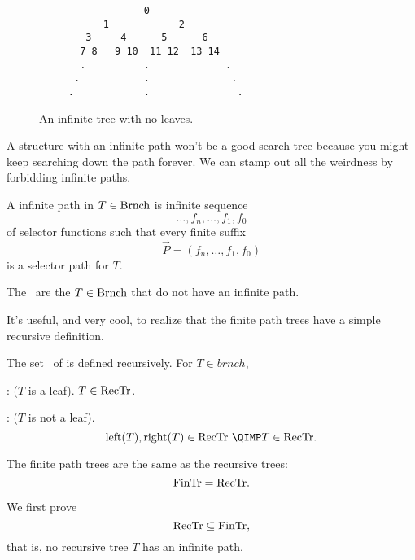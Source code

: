 \begin{figure}


\begin{verbatim}
                  0
           1            2
        3     4      5      6
       7 8   9 10  11 12  13 14
       .          .             . 
      .           .              .
     .            .               . 

\end{verbatim}

\caption{An infinite tree with no leaves.}

\label{inftree123}

\end{figure}

A structure with an infinite path won't be a good search tree because
you might keep searching down the path forever.  We can stamp out all
the weirdness by forbidding infinite paths.

\begin{definition}
A infinite path in $T \in \text{Brnch}$ is infinite sequence
\[
\dots,f_n,\dots,f_1,f_0
\]
of selector functions such that every finite suffix
\[
\vec{P} = (f_n,\dots, f_1,f_0)
\]
is a selector path for $T$.

The  \fintr\ are the $T \in \text{Brnch}$ that do
not have an infinite path.
\end{definition}

It's useful, and very cool, to realize that the finite path trees have
a simple recursive definition.

\begin{definition}
The set \rectr\ of  is defined recursively.  For $T \in brnch$,

: ($T$ is a leaf).  $T \in \text{RecTr}$.

: ($T$ is not a leaf).
\[
\leftsub{T}, \rightsub{T} \in \rectr\ \QIMP T \in \rectr.
\]
\end{definition}

\begin{theorem}
The finite path trees are the same as the recursive trees:
\[
\text{FinTr} = \text{RecTr}.
\]
\end{theorem}

We first prove
\begin{equation}\label{rectrsubfintr}
\text{RecTr} \subseteq \text{FinTr},
\end{equation}
that is, no recursive tree $T$ has an infinite path.

